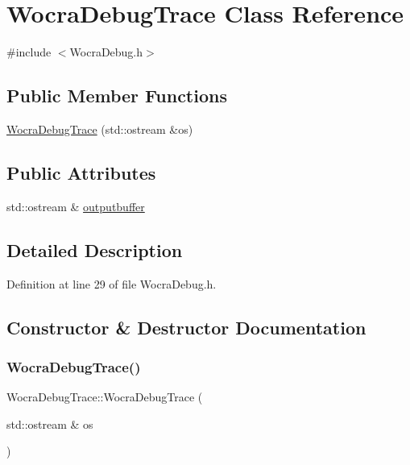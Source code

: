 \hypertarget{classWocraDebugTrace}{}\section{Wocra\+Debug\+Trace Class Reference}
\label{classWocraDebugTrace}


{\ttfamily \#include $<$Wocra\+Debug.\+h$>$}

\subsection*{Public Member Functions}
\begin{DoxyCompactItemize}
\item 
\hyperlink{classWocraDebugTrace_aedbe03cb1c6845ccadd27858fd6db063}{Wocra\+Debug\+Trace} (std\+::ostream \&os)
\end{DoxyCompactItemize}
\subsection*{Public Attributes}
\begin{DoxyCompactItemize}
\item 
std\+::ostream \& \hyperlink{classWocraDebugTrace_a948a5a59a058ea25a076da759b621852}{outputbuffer}
\end{DoxyCompactItemize}


\subsection{Detailed Description}


Definition at line 29 of file Wocra\+Debug.\+h.



\subsection{Constructor \& Destructor Documentation}
\hypertarget{classWocraDebugTrace_aedbe03cb1c6845ccadd27858fd6db063}{}\label{classWocraDebugTrace_aedbe03cb1c6845ccadd27858fd6db063} 
\subsubsection{\texorpdfstring{Wocra\+Debug\+Trace()}{WocraDebugTrace()}}
{\footnotesize\ttfamily Wocra\+Debug\+Trace\+::\+Wocra\+Debug\+Trace (\begin{DoxyParamCaption}\item[{std\+::ostream \&}]{os }\end{DoxyParamCaption})}



